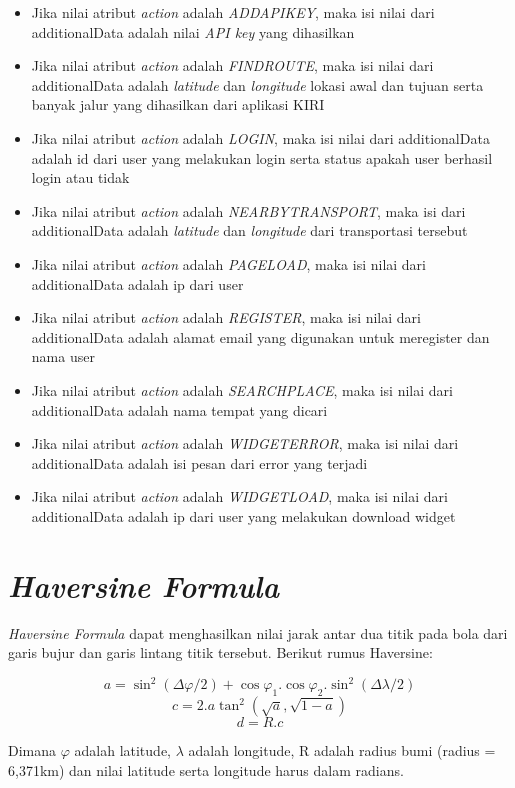 \begin{itemize}
	\item Jika nilai atribut \textsl{action} adalah \textsl{ADDAPIKEY}, maka isi nilai dari additionalData adalah nilai \textsl{API key} yang dihasilkan
	\item Jika nilai atribut \textsl{action} adalah \textsl{FINDROUTE}, maka isi nilai dari additionalData adalah \textsl{latitude} dan \textsl{longitude} lokasi awal dan tujuan serta banyak jalur yang dihasilkan dari aplikasi KIRI
	\item Jika nilai atribut \textsl{action} adalah \textsl{LOGIN}, maka isi nilai dari additionalData adalah id dari user yang melakukan login serta status apakah user berhasil login atau tidak
	\item Jika nilai atribut \textsl{action} adalah \textsl{NEARBYTRANSPORT}, maka isi dari additionalData adalah \textsl{latitude} dan \textsl{longitude} dari transportasi tersebut
	\item Jika nilai atribut \textsl{action} adalah \textsl{PAGELOAD}, maka isi nilai dari additionalData adalah ip dari user
	\item Jika nilai atribut \textsl{action} adalah \textsl{REGISTER}, maka isi nilai dari additionalData adalah alamat email yang digunakan untuk meregister dan nama user
	\item Jika nilai atribut \textsl{action} adalah \textsl{SEARCHPLACE}, maka isi nilai dari additionalData adalah nama tempat yang dicari
	\item Jika nilai atribut \textsl{action} adalah \textsl{WIDGETERROR}, maka isi nilai dari additionalData adalah isi pesan dari error yang terjadi
	\item Jika nilai atribut \textsl{action} adalah \textsl{WIDGETLOAD}, maka isi nilai dari additionalData adalah ip dari user yang melakukan download widget
\end{itemize}

\section{\textsl{Haversine Formula}}
\textsl{Haversine Formula} dapat menghasilkan nilai jarak antar dua titik pada bola dari garis bujur dan garis lintang titik tersebut. Berikut rumus Haversine:

\begin{displaymath}
	a = \sin^{2}(\Delta\varphi/2) + \cos\varphi_{1} . \cos\varphi_{2} . \sin^{2}(\Delta\lambda/2)
\end{displaymath}
\begin{displaymath}
	c = 2 . a\tan^{2}(\sqrt{a}, \sqrt{1-a})
\end{displaymath}
\begin{displaymath}
	d = R . c
\end{displaymath}

Dimana $\varphi$ adalah latitude, $\lambda$ adalah longitude, R adalah radius bumi (radius = 6,371km) dan nilai latitude serta longitude harus dalam radians.











